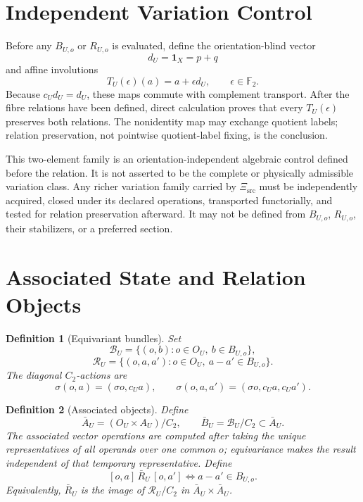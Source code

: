 \documentclass[11pt]{article}
\newtheorem{definition}{Definition}
\newcommand{\Ftwo}{\mathbb F_2}
\begin{document}
\section{Independent Variation Control}

Before any \(B_{U,o}\) or \(R_{U,o}\) is evaluated, define the
orientation-blind vector
\[
 d_U=\mathbf1_X=p+q
\]
and affine involutions
\[
 T_U(\epsilon)(a)=a+\epsilon d_U,\qquad \epsilon\in\Ftwo.
\]
Because \(c_Ud_U=d_U\), these maps commute with complement transport. After
the fibre relations have been defined, direct calculation proves that every
\(T_U(\epsilon)\) preserves both relations. The nonidentity map may exchange
quotient labels; relation preservation, not pointwise quotient-label
fixing, is the conclusion.

This two-element family is an orientation-independent algebraic control
defined before the relation. It is not asserted to be the complete or
physically admissible variation class. Any richer variation family carried
by \(\Xi_{\mathrm{src}}\) must be independently acquired, closed under its
declared operations, transported functorially, and tested for relation
preservation afterward. It may not be defined from \(B_{U,o}\),
\(R_{U,o}\), their stabilizers, or a preferred section.

\section{Associated State and Relation Objects}

\begin{definition}[Equivariant bundles]
Set
\[
\mathcal B_U=\{(o,b):o\in O_U,\ b\in B_{U,o}\},
\]
\[
\mathcal R_U=\{(o,a,a'):o\in O_U,\ a-a'\in B_{U,o}\}.
\]
The diagonal \(C_2\)-actions are
\[
\sigma(o,a)=(\sigma o,c_Ua),\qquad
\sigma(o,a,a')=(\sigma o,c_Ua,c_Ua').
\]
\end{definition}

\begin{definition}[Associated objects]
Define
\[
\bar A_U=(O_U\times A_U)/C_2,\qquad
\bar B_U=\mathcal B_U/C_2\subset\bar A_U.
\]
The associated vector operations are computed after taking the unique
representatives of all operands over one common \(o\); equivariance makes the
result independent of that temporary representative. Define
\[
[o,a]\,\bar R_U\,[o,a']
\Longleftrightarrow a-a'\in B_{U,o}.
\]
Equivalently, \(\bar R_U\) is the image of
\(\mathcal R_U/C_2\) in \(\bar A_U\times\bar A_U\).
\end{definition}
\end{document}
